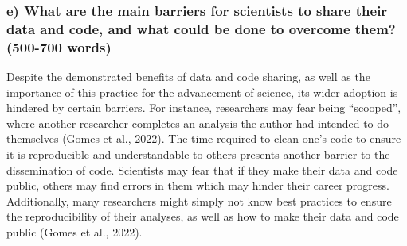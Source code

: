 \documentclass[
]{article}
\begin{document}
\subsubsection{e) What are the main barriers for scientists to share
their data and code, and what could be done to overcome them? (500-700
words)}\label{e-what-are-the-main-barriers-for-scientists-to-share-their-data-and-code-and-what-could-be-done-to-overcome-them-500-700-words}

\hfill\break
Despite the demonstrated benefits of data and code sharing, as well as
the importance of this practice for the advancement of science, its
wider adoption is hindered by certain barriers. For instance,
researchers may fear being ``scooped'', where another researcher
completes an analysis the author had intended to do themselves (Gomes et
al., 2022). The time required to clean one's code to ensure it is
reproducible and understandable to others presents another barrier to
the dissemination of code. Scientists may fear that if they make their
data and code public, others may find errors in them which may hinder
their career progress. Additionally, many researchers might simply not
know best practices to ensure the reproducibility of their analyses, as
well as how to make their data and code public (Gomes et al., 2022).
\end{document}
